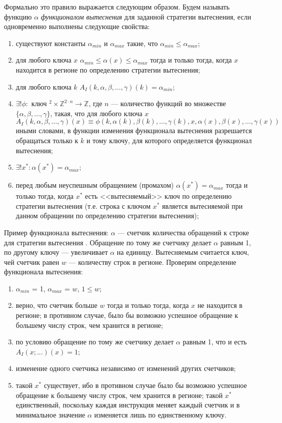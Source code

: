 Формально это правило выражается следующим образом. Будем называть функцию
$\alpha$ \emph{функционалом вытеснения} для заданной стратегии вытеснения, если
одновременно выполнены следующие свойства:
\begin{enumerate}
  \item существуют константы $\alpha_{min}$ и $\alpha_{max}$ такие, что
$\alpha_{min} \leqslant \alpha_{max}$;
  \item для любого ключа $x$ $\alpha_{min} \leqslant \alpha(x) \leqslant
\alpha_{max}$ тогда и только тогда, когда $x$ находится в регионе по определению
стратегии вытеснения;
  \item для любого ключа $k$ $A_I(k, \alpha,\beta,\dots,\gamma) (k) =
\alpha_{min}$;
  \item $\exists! \phi: \mbox{~ключ~}^2 \times \mathds{Z}^{2\cdot n} \rightarrow
\mathds{Z}$, где $n$ --- количество функций во множестве
$\{\alpha,\beta,\dots,\gamma\}$, такая, что для любого ключа $x$ $$A_I(k,
\alpha,\beta,\dots,\gamma)(x) \equiv \phi(k, \alpha(k), \beta(k), \dots,
\gamma(k), x, \alpha(x), \beta(x), \dots, \gamma(x))$$ иными словами, в функции
изменения функционала вытеснения разрешается обращаться только к $k$ и тому ключу,
для которого определяется функционал вытеснения;
  \item $\exists! x^* : \alpha(x^*) = \alpha_{max}$;
  \item перед любым неуспешным обращением (промахом) $\alpha(x^*) =
\alpha_{max}$ тогда и только тогда, когда $x^*$ есть <<вытесняемый>> ключ по
определению стратегии вытеснения (т.е. строка с ключом $x^*$ является
вытесняемой при данном обращении по определению стратегии вытеснения);
\end{enumerate}

Пример функционала вытеснения: $\alpha$ --- счетчик количества обращений к строке
для стратегии вытеснения \LRU. Обращение по тому же счетчику делает $\alpha$
равным 1, по другому ключу --- увеличивает $\alpha$ на единицу. Вытесняемым
считается ключ, чей счетчик равен $w$ --- количеству строк в регионе. Проверим
определение функционала вытеснения:
\begin{enumerate}
    \item $\alpha_{min}$ = 1, $\alpha_{max}$ = $w$, $1 \leqslant w$;
    \item верно, что счетчик больше $w$ тогда и только тогда, когда $x$ не
находится в регионе; в противном случае, было бы возможно успешное обращение к
большему числу строк, чем хранится в регионе;
    \item по условию обращение по тому же счетчику делает $\alpha$ равным 1, что
и есть $A_I(x;...)(x) = 1$;
    \item изменение одного счетчика независимо от изменений других счетчиков;
    \item такой $x^*$ существует, ибо в противном случае было бы возможно
успешное обращение к большему числу строк, чем хранится в регионе; такой $x^*$
единственный, поскольку каждая инструкция меняет каждый счетчик и в минимальное
значение $\alpha$ изменяется лишь по единственному ключу.
\end{enumerate}

